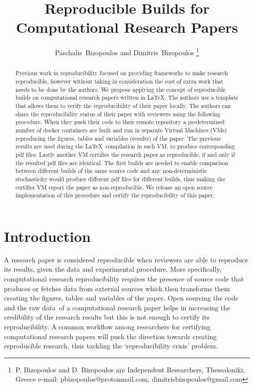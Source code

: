 \documentclass[journal]{IEEEtran}
\begin{document}

\title{Reproducible Builds for Computational Research Papers}

\author{Paschalis~Bizopoulos and Dimitris~Bizopoulos
\thanks{P. Bizopoulos and D. Bizopoulos are Independent Researchers, Thessaloniki, Greece e-mail: pbizopoulos@protonmail.com, dimitrisbizopoulos@gmail.com}}

\maketitle

\begin{abstract}
	Previous work in reproducibility focused on providing frameworks to make research reproducible, however without taking in consideration the cost of extra work that needs to be done by the authors.
	We propose applying the concept of reproducible builds on computational research papers written in \LaTeX.
	The authors use a template that allows them to verify the reproducibility of their paper locally.
	The authors can share the reproducibility status of their paper with reviewers using the following procedure.
	When they push their code to their remote repository a predetermined number of docker containers are built and run in separate Virtual Machines (VMs) reproducing the figures, tables and variables (results) of the paper.
	The previous results are used during the \LaTeX\ compilation in each VM, to produce corresponding pdf files.
	Lastly another VM certifies the research paper as reproducible, if and only if the resulted pdf files are identical.
	The first builds are needed to enable comparison between different builds of the same source code and any non-deterministic stochasticity would produce different pdf files for different builds, thus making the certifier VM report the paper as non-reproducible.
	We release an open source implementation of this procedure and certify the reproducibility of this paper.
\end{abstract}

\section{Introduction}
A research paper is considered reproducible when reviewers are able to reproduce its results, given the data and experimental procedure.
More specifically, computational research reproducibility requires the presence of source code that produces or fetches data from external sources which then transforms them creating the figures, tables and variables of the paper.
Open sourcing the code and the raw data of a computational research paper helps in increasing the credibility of the research results but this is not enough to certify its reproducibility.
A common workflow among researchers for certifying computational research papers will push the direction towards creating reproducible research, thus tackling the `reproducibility crisis' problem.
\end{document}
